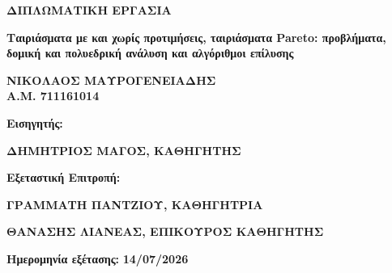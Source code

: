 \begin{center}

\vspace*{2cm}

{\large \textbf{ΔΙΠΛΩΜΑΤΙΚΗ ΕΡΓΑΣΙΑ}}

\vspace{0.8cm}

{\large \textbf{Ταιριάσματα με και χωρίς προτιμήσεις, ταιριάσματα Pareto: προβλήματα, δομική και πολυεδρική ανάλυση και αλγόριθμοι επίλυσης}}

\vspace{1.5cm}

{\large \textbf{ΝΙΚΟΛΑΟΣ ΜΑΥΡΟΓΕΝΕΙΑΔΗΣ}}\\
{\large \textbf{Α.Μ. 711161014}}

\vspace{2cm}

\end{center}

\noindent
\textbf{Εισηγητής:}

\vspace{0.4cm}

\noindent
\textbf{ΔΗΜΗΤΡΙΟΣ ΜΑΓΟΣ, ΚΑΘΗΓΗΤΗΣ}

\vspace{2.5cm}

\noindent
\textbf{Εξεταστική Επιτροπή:}

\vspace{0.4cm}

\noindent
\textbf{ΓΡΑΜΜΑΤΗ ΠΑΝΤΖΙΟΥ, ΚΑΘΗΓΗΤΡΙΑ}

\vspace{2.5cm}

\noindent
\textbf{ΘΑΝΑΣΗΣ ΛΙΑΝΕΑΣ, ΕΠΙΚΟΥΡΟΣ ΚΑΘΗΓΗΤΗΣ}


\vspace{2.5cm}

\noindent
\textbf{Ημερομηνία εξέτασης:} \textbf{14/07/2026}

\clearpage